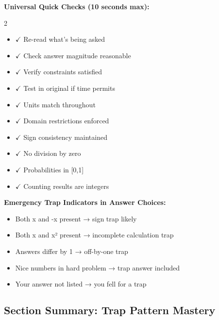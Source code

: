 \documentclass{article}
\begin{document}
\begin{tcolorbox}[colback=yellow!5!white,colframe=yellow!75!black,title={\textbf{One-Page Trap Summary for Exam Day}}]
\textbf{Universal Quick Checks (10 seconds max):}
\begin{multicols}{2}
\begin{itemize}[nosep]
\item $\checkmark$ Re-read what's being asked
\item $\checkmark$ Check answer magnitude reasonable
\item $\checkmark$ Verify constraints satisfied
\item $\checkmark$ Test in original if time permits
\item $\checkmark$ Units match throughout
\item $\checkmark$ Domain restrictions enforced
\item $\checkmark$ Sign consistency maintained
\item $\checkmark$ No division by zero
\item $\checkmark$ Probabilities in [0,1]
\item $\checkmark$ Counting results are integers
\end{itemize}
\end{multicols}

\textbf{Emergency Trap Indicators in Answer Choices:}
\begin{itemize}[nosep]
\item Both x and -x present → sign trap likely
\item Both x and x² present → incomplete calculation trap
\item Answers differ by 1 → off-by-one trap
\item Nice numbers in hard problem → trap answer included
\item Your answer not listed → you fell for a trap
\end{itemize}
\end{tcolorbox}

\subsection{Section Summary: Trap Pattern Mastery}
\end{document}
